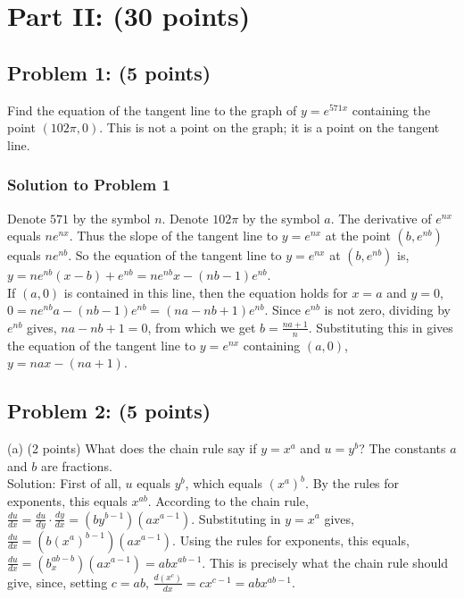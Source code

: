\documentclass{article}
\begin{document}

\section*{Part II: (30 points)}
\subsection*{Problem 1: (5 points)}
Find the equation of the tangent line to the graph of $y = e^{571x}$ containing the point $(102 \pi, 0)$. This is not a point on the graph; it is a point on the tangent line.
\subsubsection*{Solution to Problem 1}
Denote $571$ by the symbol $n$. Denote $102 \pi$ by the symbol $a$. The derivative of $e^{nx}$ equals $n e^{nx}$. Thus the slope of the tangent line to $y = e^{nx}$ at the point $(b, e^{nb})$ equals $n e^{nb}$. So the equation of the tangent line to $y = e^{nx}$ at $(b, e^{nb})$ is, $y = n e^{nb}(x - b) + e^{nb} = n e^{nb}x - (nb - 1)e^{nb}$.\\
If $(a, 0)$ is contained in this line, then the equation holds for $x = a$ and $y = 0$, $0 = n e^{nb}a - (nb - 1)e^{nb} = (na - nb + 1)e^{nb}$. Since $e^{nb}$ is not zero, dividing by $e^{nb}$ gives, $na - nb + 1 = 0$, from which we get $b = \frac{na + 1}{n}$. Substituting this in gives the equation of the tangent line to $y = e^{nx}$ containing $(a, 0)$, $y = nax - (na + 1)$.

\subsection*{Problem 2: (5 points)}
(a) (2 points) What does the chain rule say if $y = x^{a}$ and $u = y^{b}$? The constants $a$ and $b$ are fractions.\\
Solution: First of all, $u$ equals $y^{b}$, which equals $(x^{a})^{b}$. By the rules for exponents, this equals $x^{ab}$. According to the chain rule, $\frac{du}{dx} = \frac{du}{dy} \cdot \frac{dy}{dx} = (by^{b-1})(ax^{a-1})$. Substituting in $y = x^{a}$ gives, $\frac{du}{dx} = (b(x^{a})^{b-1})(ax^{a-1})$. Using the rules for exponents, this equals, $\frac{du}{dx} = (b_{x}^{ab-b})(ax^{a-1}) = abx^{ab-1}$. This is precisely what the chain rule should give, since, setting $c = ab$, $\frac{d(x^{c})}{dx} = cx^{c-1} = abx^{ab-1}$.

\end{document}
